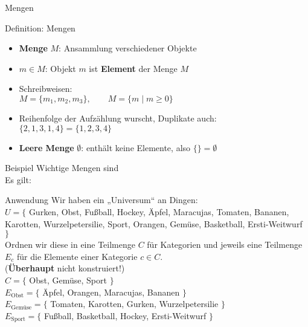 \begin{frame}{Mengen}
	\pause %
	\begin{block}{Definition: Mengen} \vspace{-.5\baselineskip}
		\begin{itemize}
			\item \textbf{Menge} $M$: Ansammlung verschiedener Objekte
			\item $m \in M$: Objekt $m$ ist \textbf{Element} der Menge $M$
			\item Schreibweisen: \\
			$M = \{m_1, m_2, m_3 \}, \qquad M = \{m \mid m \geq 0\}$
			\item Reihenfolge der Aufzählung wurscht, Duplikate auch: \\
			$\{2,1,3,1,4\} = \{1,2,3,4\}$
			\item \textbf{Leere Menge} $\emptyset$: enthält keine Elemente, \quad also $\{\} = \emptyset$
		\end{itemize}
	\end{block}
	\pause
	
	\begin{block}{Beispiel}
		Wichtige Mengen sind \\ 
		Es gilt:\\ 
	\end{block}
	
\end{frame}

\begin{frame}{Anwendung}
	Wir haben ein „Universum“ an Dingen:\\ 
	$U = \{ $ Gurken, Obst, Fußball, Hockey, Äpfel, Maracujas, Tomaten, Bananen, Karotten, Wurzelpetersilie, Sport,  Orangen, Gemüse, Basketball, Ersti-Weitwurf $ \} $  \\[0.5em]
	
	\pause
	Ordnen wir diese in eine Teilmenge $C$ für Kategorien und jeweils eine Teilmenge $E_c$ für die Elemente einer Kategorie $c \in C$. \\ {\small (\textbf{Überhaupt} nicht konstruiert!)} \\[0.5em]
	
	\pause
	$C = \{$ Obst, Gemüse, Sport $\}$ \\[0.3em]
	$E_{\text{Obst}} = \{$ Äpfel, Orangen, Maracujas, Bananen $\}$ \\
	$E_{\text{Gemüse}} = \{$ Tomaten, Karotten, Gurken, Wurzelpetersilie $\}$ \\
	$E_{\text{Sport}} = \{$ Fußball, Basketball, Hockey, Ersti-Weitwurf $\}$
	
\end{frame}

